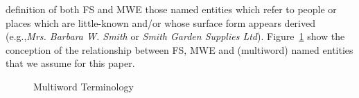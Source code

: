 \documentclass[11pt,letterpaper]{article}
\makeatletter
\def \eg {e.g.,\@ }
\newcommand{\ex}[1]{\textit{#1}\xspace}
\newcommand{\termdef}[1]{\textbf{#1}\xspace}
\newcommand{\figref}[2][]{Figure#1~\ref{#2}\xspace}
\makeatother
\begin{document}
definition of both FS and MWE those named entities which refer to people or places which are little-known and/or whose surface form appears derived (\eg \ex{Mrs. Barbara W. Smith} or \ex{Smith Garden Supplies Ltd}). \figref{fig:terminology} show the conception of the relationship between FS, MWE and (multiword) named entities that we assume for this paper.


\begin{figure}[!t]
\caption{Multiword Terminology}
\label{fig:terminology}
\end{figure}



\end{document}
